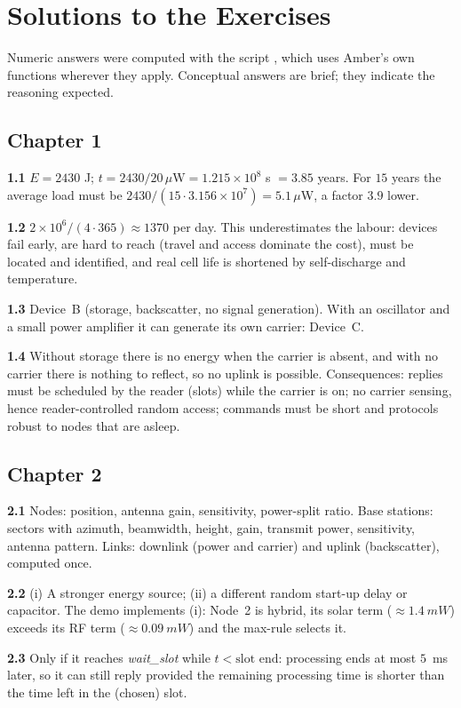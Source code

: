 \chapter{Solutions to the Exercises}
\label{app:solutions}

\newcommand{\sol}[1]{\par\smallskip\noindent\textbf{\sffamily\color{ablue}#1}\enspace}
Numeric answers were computed with the script , which uses Amber's own functions wherever they apply. Conceptual answers are brief; they indicate the reasoning expected.

\section*{Chapter 1}
\sol{1.1} $E=2430$ J; $t=2430/20\,\mu\mathrm W=1.215\times10^{8}$ s $=3.85$ years. For $15$ years the average load must be $2430/(15\cdot3.156\times10^{7})=5.1\,\mu$W, a factor $3.9$ lower.
\sol{1.2} $2\times10^6/(4\cdot365)\approx1370$ per day. This underestimates the labour: devices fail early, are hard to reach (travel and access dominate the cost), must be located and identified, and real cell life is shortened by self-discharge and temperature.
\sol{1.3} Device~B (storage, backscatter, no signal generation). With an oscillator and a small power amplifier it can generate its own carrier: Device~C.
\sol{1.4} Without storage there is no energy when the carrier is absent, and with no carrier there is nothing to reflect, so no uplink is possible. Consequences: replies must be scheduled by the reader (slots) while the carrier is on; no carrier sensing, hence reader-controlled random access; commands must be short and protocols robust to nodes that are asleep.

\section*{Chapter 2}
\sol{2.1} Nodes: position, antenna gain, sensitivity, power-split ratio. Base stations: sectors with azimuth, beamwidth, height, gain, transmit power, sensitivity, antenna pattern. Links: downlink (power and carrier) and uplink (backscatter), computed once.
\sol{2.2} (i) A stronger energy source; (ii) a different random start-up delay or capacitor. The demo implements (i): Node~2 is hybrid, its solar term ($\approx\SI{1.4}{mW}$) exceeds its RF term ($\approx\SI{0.09}{mW}$) and the max-rule selects it.
\sol{2.3} Only if it reaches \emph{wait\_slot} while $t<\text{slot end}$: processing ends at most $5$~ms later, so it can still reply provided the remaining processing time is shorter than the time left in the (chosen) slot.


